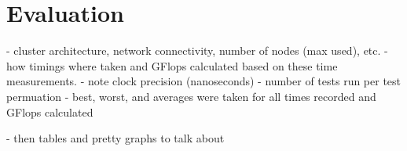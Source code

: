 \section{Evaluation}\label{sec:dspmv-evaluation}

- cluster architecture, network connectivity, number of nodes (max used), etc.
- how timings where taken and GFlops calculated based on these time measurements. 
	- note clock precision (nanoseconds)
- number of tests run per test permuation
	- best, worst, and averages were taken for all times recorded and GFlops calculated
	
- then tables and pretty graphs to talk about 